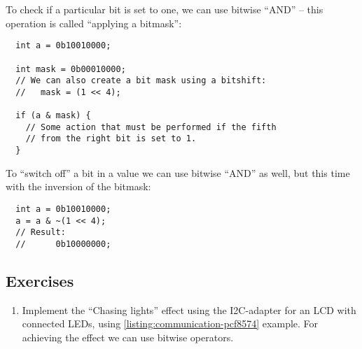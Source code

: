 \documentclass[../sparc.tex]{subfiles}
\begin{document}
To check if a particular bit is set to one, we can use bitwise ``AND'' -- this
operation is called ``applying a bitmask'':

\begin{verbatim}
  int a = 0b10010000;

  int mask = 0b00010000;
  // We can also create a bit mask using a bitshift:
  //   mask = (1 << 4);

  if (a & mask) {
    // Some action that must be performed if the fifth
    // from the right bit is set to 1.
  }
\end{verbatim}

To ``switch off'' a bit in a value we can use bitwise ``AND'' as well, but this
time with the inversion of the bitmask:

\begin{verbatim}
  int a = 0b10010000;
  a = a & ~(1 << 4);
  // Result:
  //      0b10000000;
\end{verbatim}

\subsection{Exercises}

\begin{enumerate}
\item Implement the ``Chasing lights'' effect using the I2C-adapter for an LCD
  with connected LEDs, using \ref{listing:communication-pcf8574} example.  For
  achieving the effect we can use bitwise operators.
\end{enumerate}
\end{document}
